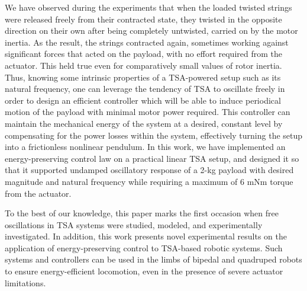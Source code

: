 We have observed during the experiments that when the loaded twisted strings were released freely from their contracted state, they  twisted in the opposite direction on their own after being completely untwisted, carried on by the motor inertia. As the result, the strings contracted again, sometimes working against significant forces that acted on the payload, with no effort required from the actuator. This held true even for comparatively small values of rotor inertia.
Thus, knowing some intrinsic properties of a TSA-powered setup such as its natural frequency, one can leverage the tendency of TSA to oscillate freely in order to design an efficient controller which will be able to induce periodical motion of the payload with minimal motor power required. This controller can maintain the mechanical energy of the system at a desired, constant level by compensating for the power losses within the system, effectively turning the setup into a frictionless nonlinear pendulum. In this work, we have implemented an energy-preserving control law on a practical linear TSA setup, and designed it so that it supported undamped oscillatory response of a 2-kg payload with desired magnitude and natural frequency while  requiring a maximum of 6 mNm torque from the actuator. 

To the best of our knowledge, this paper marks the first occasion when free oscillations in TSA systems were studied, modeled, and experimentally investigated. In addition, this work presents novel experimental results on the application of energy-preserving control to TSA-based robotic systems. Such systems and controllers can be used in the limbs of bipedal and quadruped robots to ensure energy-efficient locomotion, even in the presence of severe actuator limitations.


